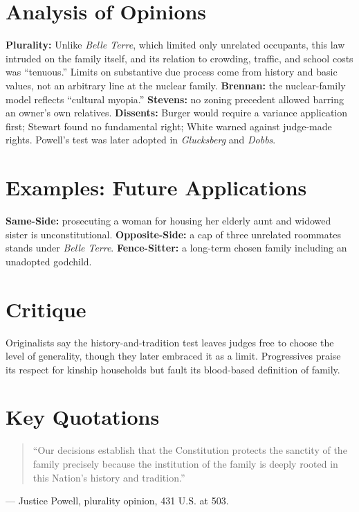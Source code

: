 \documentclass[12pt]{article}
\begin{document}
\section{Analysis of Opinions}
\textbf{Plurality:} Unlike \textit{Belle Terre}, which limited only unrelated occupants, this law intruded on the family itself, and its relation to crowding, traffic, and school costs was ``tenuous.'' Limits on substantive due process come from history and basic values, not an arbitrary line at the nuclear family. \textbf{Brennan:} the nuclear-family model reflects ``cultural myopia.'' \textbf{Stevens:} no zoning precedent allowed barring an owner's own relatives. \textbf{Dissents:} Burger would require a variance application first; Stewart found no fundamental right; White warned against judge-made rights. Powell's test was later adopted in \textit{Glucksberg} and \textit{Dobbs}.

\section{Examples: Future Applications}
\textbf{Same-Side:} prosecuting a woman for housing her elderly aunt and widowed sister is unconstitutional. \textbf{Opposite-Side:} a cap of three unrelated roommates stands under \textit{Belle Terre}. \textbf{Fence-Sitter:} a long-term chosen family including an unadopted godchild.

\section{Critique}
Originalists say the history-and-tradition test leaves judges free to choose the level of generality, though they later embraced it as a limit. Progressives praise its respect for kinship households but fault its blood-based definition of family.

\section{Key Quotations}
\begin{quote}
``Our decisions establish that the Constitution protects the sanctity of the family precisely because the institution of the family is deeply rooted in this Nation's history and tradition.''
\end{quote}
\noindent --- Justice Powell, plurality opinion, 431 U.S. at 503.
\end{document}
